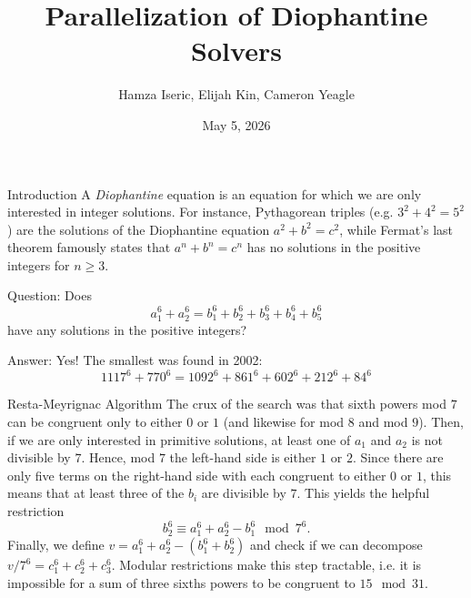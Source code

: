 \documentclass[]{beamer}
\title{Parallelization of Diophantine Solvers}
\author{Hamza Iseric, Elijah Kin, Cameron Yeagle}
\date{May 5, 2026}
\begin{document}
\begin{frame}
  \titlepage
\end{frame}

\begin{frame}{Introduction}
  A \emph{Diophantine} equation is an equation for which we are only interested in integer solutions.
  \pause
  For instance, Pythagorean triples (e.g. $3^2 + 4^2 = 5^2$) are the solutions of the Diophantine equation $a^2 + b^2 = c^2$, while Fermat's last theorem famously states that $a^n + b^n = c^n$ has no solutions in the positive integers for $n \geq 3$.
  \pause
  \bigskip

  Question: Does
  \begin{equation*}
    a_1^6 + a_2^6 = b_1^6 + b_2^6 + b_3^6 + b_4^6 + b_5^6
  \end{equation*}
  have any solutions in the positive integers?
  \pause
  \bigskip

  Answer: Yes! The smallest was found in 2002:
  \begin{equation*}
    1117^6 + 770^6 = 1092^6 + 861^6 + 602^6 + 212^6 + 84^6
  \end{equation*}
\end{frame}

\begin{frame}{Resta-Meyrignac Algorithm}
  The crux of the search was that sixth powers mod $7$ can be congruent only to either $0$ or $1$ (and likewise for mod $8$ and mod $9$).
  \pause
  Then, if we are only interested in primitive solutions, at least one of $a_1$ and $a_2$ is not divisible by $7$.
  \pause
  Hence, mod $7$ the left-hand side is either $1$ or $2$.
  \pause
  Since there are only five terms on the right-hand side with each congruent to either $0$ or $1$, this means that at least three of the $b_i$ are divisible by $7$.
  \pause
  This yields the helpful restriction
  \begin{equation*}
    b_2^6 \equiv a_1^6 + a_2^6 - b_1^6 \mod 7^6.
  \end{equation*}
  \pause
  Finally, we define $v = a_1^6 + a_2^6 - (b_1^6 + b_2^6)$ and check if we can decompose $v / 7^6 = c_1^6 + c_2^6 + c_3^6$.
  \pause
  Modular restrictions make this step tractable,
  \pause
  i.e. it is impossible for a sum of three sixths powers to be congruent to $15 \mod 31$.
\end{frame}
\end{document}

